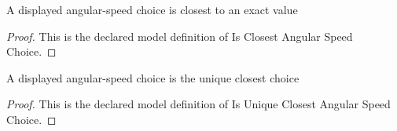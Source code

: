 \begin{definition}
  \label{def:physics:phyx-mini-0790:phyxminiproblems-problemphyxmini0790-isclosestangularspeedchoice}
  A displayed angular-speed choice is closest to an exact value
\end{definition}
\begin{proof}
  This is the declared model definition of Is Closest Angular Speed Choice.
\end{proof}
\begin{definition}
  \label{def:physics:phyx-mini-0790:phyxminiproblems-problemphyxmini0790-isuniqueclosestangularspeedchoice}
  A displayed angular-speed choice is the unique closest choice
\end{definition}
\begin{proof}
  This is the declared model definition of Is Unique Closest Angular Speed Choice.
\end{proof}
